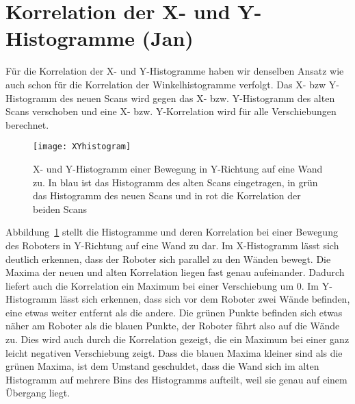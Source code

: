 \section{Korrelation der X- und Y-Histogramme (Jan)}

Für die Korrelation der X- und Y-Histogramme haben wir denselben Ansatz wie auch schon für die Korrelation der Winkelhistogramme verfolgt. Das X- bzw Y-Histogramm des neuen Scans wird gegen das X- bzw. Y-Histogramm des alten Scans verschoben und eine X- bzw. Y-Korrelation wird für alle Verschiebungen berechnet.

\begin{figure}
	\centering
	\texttt{[image: XYhistogram]}
	\caption{X- und Y-Histogramm einer Bewegung in Y-Richtung auf eine Wand zu. In blau ist das Histogramm des alten Scans eingetragen, in grün das Histogramm des neuen Scans und in rot die Korrelation der beiden Scans}
	\label{fig:xyhistogram}
\end{figure}

Abbildung~\ref{fig:xyhistogram} stellt die Histogramme und deren Korrelation bei einer Bewegung des Roboters in Y-Richtung auf eine Wand zu dar. Im X-Histogramm lässt sich deutlich erkennen, dass der Roboter sich parallel zu den Wänden bewegt. Die Maxima der neuen und alten Korrelation liegen fast genau aufeinander. Dadurch liefert auch die Korrelation ein Maximum bei einer Verschiebung um 0. Im Y-Histogramm lässt sich erkennen, dass sich vor dem Roboter zwei Wände befinden, eine etwas weiter entfernt als die andere. Die grünen Punkte befinden sich etwas näher am Roboter als die blauen Punkte, der Roboter fährt also auf die Wände zu. Dies wird auch durch die Korrelation gezeigt, die ein Maximum bei einer ganz leicht negativen Verschiebung zeigt. Dass die blauen Maxima kleiner sind als die grünen Maxima, ist dem Umstand geschuldet, dass die Wand sich im alten Histogramm auf mehrere Bins des Histogramms aufteilt, weil sie genau auf einem Übergang liegt.
